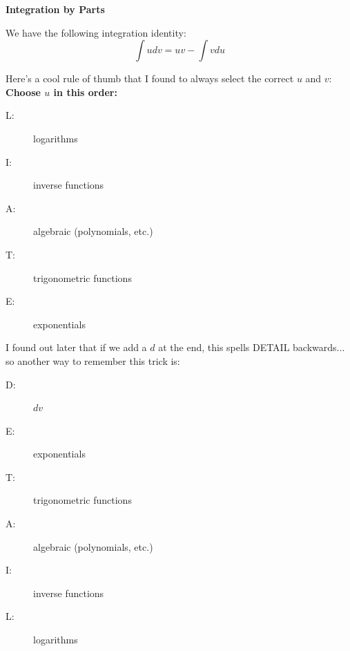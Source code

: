 
\chead{\today}
\graphicspath{ {\string~/Desktop} }
\usetikzlibrary{arrows}
\newcommand{\ans}[1]{ \noindent {\color{red} \textbf{Answer:} #1}}

\begin{center}
\textbf{Integration by Parts}
\end{center}

\begin{prop}
We have the following integration identity:
\[
\int u dv = uv - \int v du
\]
\end{prop}
\begin{aun}
Here's a cool rule of thumb that I found to always select the correct $u$ and $v$: \textbf{Choose $u$ in this order:}
\begin{description}
\item[L:] logarithms
\item[I:] inverse functions
\item[A:] algebraic (polynomials, etc.)
\item[T:] trigonometric functions
\item[E:] exponentials
\end{description}
\end{aun}

\begin{aun}
I found out later that if we add a $d$ at the end, this spells DETAIL backwards... so another way to remember this trick is:
\begin{description}
\item[D:] $dv$
\item[E:] exponentials
\item[T:] trigonometric functions
\item[A:] algebraic (polynomials, etc.)
\item[I:] inverse functions
\item[L:] logarithms
\end{description}
\end{aun}


